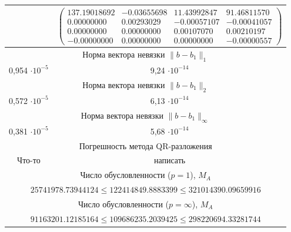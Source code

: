 \documentclass[12pt, a4paper]{article}
\begin{document}
\begin{center}
\begin{tabular}{|c|c|}
{		} & 
		\tiny{
			$
			\begin{pmatrix}
				137.19018692 & -0.03655698 & 11.43992847 & 91.46811570 \\ 
				0.00000000 & 0.00293029 & -0.00057107 & -0.00041057 \\ 
				0.00000000 & 0.00000000 & 0.00107070 & 0.00210197 \\ 
				-0.00000000 & 0.00000000 & 0.00000000 & -0.00000557 
			\end{pmatrix}
			$
			
		}\\
		\hline \multicolumn{2}{|c|}{Норма вектора невязки $\|b - b_1 \|_1$}\\
		\hline
		0,954 $\cdot 10^{-5}$ & 9,24 $\cdot 10^{-14}$\\
		\hline \multicolumn{2}{|c|}{Норма вектора невязки $\|b - b_1 \|_2$}\\
		\hline
		0,572 $\cdot 10^{-5}$ & 6,13 $\cdot 10^{-14}$\\
		\hline \multicolumn{2}{|c|}{Норма вектора невязки $\|b - b_1 \|_{\infty}$}\\
		\hline
		0,381 $\cdot 10^{-5}$ & 5,68 $\cdot 10^{-14}$\\
		\hline  \multicolumn{2}{|c|}{Погрешность метода QR-разложения}\\
		\hline
		Что-то & написать \\
		\hline 
		\multicolumn{2}{|c|}{ Число обусловленности ($p = 1 $), $M_A$}\\
		\hline
		\multicolumn{2}{|c|}{$25741978.73944124 \leqslant 122414849.8883399 \leqslant 	321014390.09659916$}\\
    	\hline \multicolumn{2}{|c|}{Число обусловленности ($p = \infty $), $M_A$}\\
    	\hline \multicolumn{2}{|c|}{$91163201.12185164 \leqslant 109686235.2039425\leqslant 298220694.33281744$}\\
    	\hline
    
    	
    \end{tabular}
\end{center}
\end{document}
